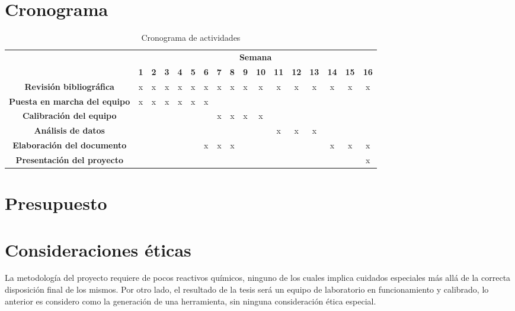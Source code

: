 \section{Cronograma}
	\begin{table}[h]
		\centering
		\caption{Cronograma de actividades}
		\label{tb: cronograma}
		\footnotesize
		\begin{tabular}{|c|c|c|c|c|c|c|c|c|c|c|c|c|c|c|c|c|}
			\hline
			\rowcolor[HTML]{C0C0C0} 
			\cellcolor[HTML]{C0C0C0}                                       & \multicolumn{16}{c|}{\cellcolor[HTML]{C0C0C0}\textbf{Semana}} \\ \cline{2-17} 
			\rowcolor[HTML]{EFEFEF} 
			\multirow{-2}{*}{\cellcolor[HTML]{C0C0C0}\textbf{Actividades}} & \textbf{1} & \textbf{2} & \textbf{3} & \textbf{4} & \textbf{5} & \textbf{6} & \textbf{7} & \textbf{8} & \textbf{9} & \textbf{10} & \textbf{11} & \textbf{12} & \textbf{13} & \textbf{14} & \textbf{15} & \textbf{16} \\ \hline
			\cellcolor[HTML]{EFEFEF}
			\textbf{Revisión bibliográfica} & x & x & x & x & x & x & x & x & x & x & x & x & x & x & x & x \\ \hline
			\cellcolor[HTML]{EFEFEF}\textbf{Puesta en marcha del equipo} & x & x & x & x & x & x & & & & & & & & & & \\ \hline
			\cellcolor[HTML]{EFEFEF}\textbf{Calibración del equipo} & & & & & & & x & x & x & x & & & & & & \\ \hline
			\cellcolor[HTML]{EFEFEF}\textbf{Análisis de datos} & & & & & & & & & & & x & x & x & & & \\ \hline
			\cellcolor[HTML]{EFEFEF}\textbf{Elaboración del documento} & & & & & & x & x & x & & & & & & x & x & x \\ \hline
			\cellcolor[HTML]{EFEFEF}\textbf{Presentación del proyecto} & & & & & & & & & & & & & & & & x \\ \hline
		\end{tabular}
	\end{table}

\section{Presupuesto}

\section{Consideraciones éticas}
	La metodología del proyecto requiere de pocos reactivos químicos, ninguno de los cuales implica cuidados especiales más allá de la correcta disposición final de los mismos. Por otro lado, el resultado de la tesis será un equipo de laboratorio en funcionamiento y calibrado, lo anterior es considero como la generación de una herramienta, sin ninguna consideración ética especial.